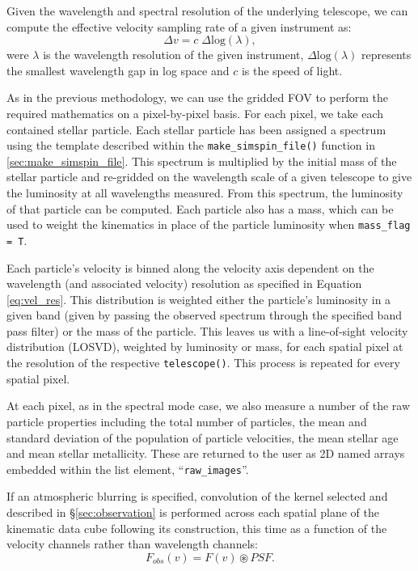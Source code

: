 \documentclass[
  journal=pasa,
  manuscript=research-paper, %
  year=2020,
  volume=37,
]{cup-journal}
\newcommand{\makesimspinfile}[1]{\texttt{make\_simspin\_file()}#1}
\newcommand{\telescope}[1]{\texttt{telescope()}#1}
\begin{document}
Given the wavelength and spectral resolution of the underlying telescope, we can compute the effective velocity sampling rate of a given instrument as:
\begin{equation}
\label{eq:vel_res}
    \Delta v = c \; \Delta \text{log}(\lambda),
\end{equation}
were $\lambda$ is the wavelength resolution of the given instrument, $\Delta \text{log}(\lambda)$ represents the smallest wavelength gap in log space and $c$ is the speed of light. 

As in the previous methodology, we can use the gridded FOV to perform the required mathematics on a pixel-by-pixel basis. 
For each pixel, we take each contained stellar particle. 
Each stellar particle has been assigned a spectrum using the template described within the \makesimspinfile{} function in \cref{sec:make_simspin_file}. 
This spectrum is multiplied by the initial mass of the stellar particle and re-gridded on the wavelength scale of a given telescope to give the luminosity at all wavelengths measured.
From this spectrum, the luminosity of that particle can be computed. 
Each particle also has a mass, which can be used to weight the kinematics in place of the particle luminosity when \texttt{mass\_flag = T}.

Each particle's velocity is binned along the velocity axis dependent on the wavelength (and associated velocity) resolution as specified in Equation \ref{eq:vel_res}. 
This distribution is weighted either the particle's luminosity in a given band (given by passing the observed spectrum through the specified band pass filter) or the mass of the particle. 
This leaves us with a line-of-sight velocity distribution (LOSVD), weighted by luminosity or mass, for each spatial pixel at the resolution of the respective \telescope. 
This process is repeated for every spatial pixel. 

At each pixel, as in the spectral mode case, we also measure a number of the raw particle properties including the total number of particles, the mean and standard deviation of the population of particle velocities, the mean stellar age and mean stellar metallicity. These are returned to the user as 2D named arrays embedded within the list element, ``\texttt{raw\_images}''.

If an atmospheric blurring is specified, convolution of the kernel selected and described in \S \ref{sec:observation} is performed across each spatial plane of the kinematic data cube following its construction, this time as a function of the velocity channels rather than wavelength channels:
\begin{equation}
    F_{obs}(v) = F(v) \circledast PSF.
\end{equation}
\end{document}
